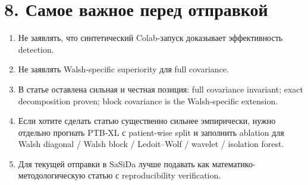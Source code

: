 \documentclass[12pt,a4paper]{article}
\begin{document}
\section*{8. Самое важное перед отправкой}

\begin{enumerate}[label=\arabic*)]
\item Не заявлять, что синтетический Colab-запуск доказывает эффективность detection.
\item Не заявлять Walsh-specific superiority для full covariance.
\item В статье оставлена сильная и честная позиция: full covariance invariant; exact decomposition proven; block covariance is the Walsh-specific extension.
\item Если хотите сделать статью существенно сильнее эмпирически, нужно отдельно прогнать PTB-XL с patient-wise split и заполнить ablation для Walsh diagonal / Walsh block / Ledoit--Wolf / wavelet / isolation forest.
\item Для текущей отправки в SaSiDa лучше подавать как математико-методологическую статью с reproducibility verification.
\end{enumerate}
\end{document}
